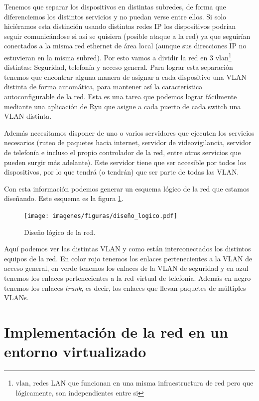 Tenemos que separar los dispositivos en distintas subredes, de forma que diferenciemos los distintos servicios y no puedan verse entre ellos. Si solo hiciéramos esta distinción usando distintas redes IP los dispositivos podrían seguir comunicándose si así se quisiera (posible ataque a la red) ya que seguirían conectados a la misma red ethernet de área local (aunque sus direcciones IP no estuvieran en la misma subred). Por esto vamos a dividir la red en 3 \acrshort{vlan}\footnote{\acrlong{vlan}, redes LAN que funcionan en una misma infraestructura de red pero que lógicamente, son independientes entre si} distintas: Seguridad, telefonía y acceso general. Para lograr esta separación tenemos que encontrar alguna manera de asignar a cada dispositivo una VLAN distinta de forma automática, para mantener así la característica autoconfigurable de la red. Esta es una tarea que podemos lograr fácilmente mediante una aplicación de Ryu que asigne a cada puerto de cada switch una VLAN distinta.

Además necesitamos disponer de uno o varios servidores que ejecuten los servicios necesarios (ruteo de paquetes hacia internet, servidor de videovigilancia, servidor de telefonía e incluso el propio controlador de la red, entre otros servicios que pueden surgir más adelante). Este servidor tiene que ser accesible por todos los dispositivos, por lo que tendrá (o tendrán) que ser parte de todas las VLAN. 

Con esta información podemos generar un esquema lógico de la red que estamos diseñando. Este esquema es la figura \ref{fig:diseño_logico}.

\begin{figure}[!h]
    \centering
    \texttt{[image: imagenes/figuras/diseño\_logico.pdf]}
    \caption{Diseño lógico de la red.}
    \label{fig:diseño_logico}
\end{figure}

Aquí podemos ver las distintas VLAN y como están interconectados los distintos equipos de la red. En color rojo tenemos los enlaces pertenecientes a la VLAN de acceso general, en verde tenemos los enlaces de la VLAN de seguridad y en azul tenemos los enlaces pertenecientes a la red virtual de telefonía. Además en negro tenemos los enlaces \emph{trunk}, es decir, los enlaces que llevan paquetes de múltiples VLANs.


\section{Implementación de la red en un entorno virtualizado}

